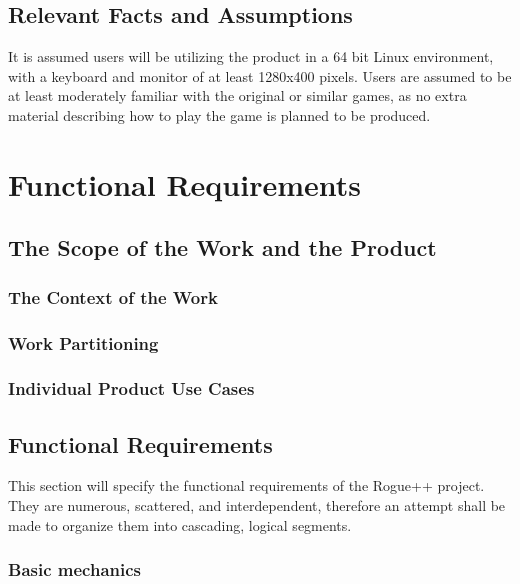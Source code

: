 \documentclass[12pt, titlepage]{article}
\begin{document}
	\subsection{Relevant Facts and Assumptions}

It is assumed users will be utilizing the product in a 64 bit Linux environment, with a keyboard and monitor of at least 1280x400 pixels. Users are assumed to be at least moderately familiar with the original or similar games, as no extra material describing how to play the game is planned to be produced.

\section{Functional Requirements}

	\subsection{The Scope of the Work and the Product}

		\subsubsection{The Context of the Work}

		\subsubsection{Work Partitioning}

		\subsubsection{Individual Product Use Cases}

	\subsection{Functional Requirements}

	This section will specify the functional requirements of the Rogue++ project. They are numerous, scattered, and interdependent, therefore an attempt shall be made to organize them into cascading, logical segments.

		\subsubsection{Basic mechanics}
\end{document}
